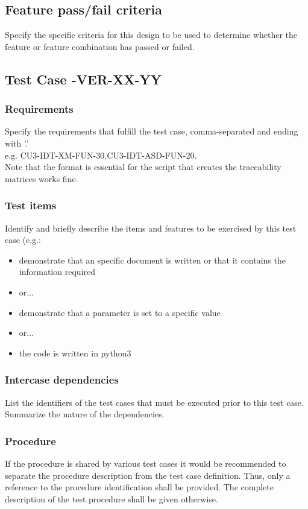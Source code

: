 \documentclass[DM,lsstdraft,STS,toc]{lsstdoc}
\begin{document}
\subsection{Feature pass/fail criteria \label{sect:passfail}}
Specify the specific criteria for this design to be used to determine whether the feature or feature combination has passed or failed.

\subsection{Test Case \product-VER-XX-YY \label{sect:testcaseid}}

\subsubsection{Requirements \label{sect:reqs}}
Specify the requirements that fulfill the test case, comma-separated and ending with '.'\\
e.g. CU3-IDT-XM-FUN-30,CU3-IDT-ASD-FUN-20.\\
Note that the format is essential for the script that creates the traceability matrices works fine.

\subsubsection{Test items \label{sect:tcitems}}
Identify and briefly describe the items and features to be exercised by this test case (e.g.:
\begin{itemize}
\item  demonstrate that an
specific document is written or that it contains the information required
\item or...
\item demonstrate that a parameter is set to a specific value
\item or...
\item the code is written in python3
\end{itemize}

\subsubsection{Intercase dependencies \label{interface_dependencies}}
List the identifiers of the test cases that must be executed prior to this test case. Summarize the nature of the dependencies.

\subsubsection{Procedure \label{procedures}}
If the procedure is shared by various test cases it would be recommended to separate the procedure description from the test
case definition. Thus, only a reference to the procedure identification shall be provided. The complete description of
the test procedure shall be given otherwise. \\
\end{document}
